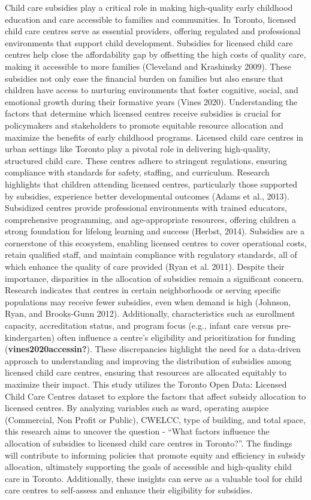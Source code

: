 \documentclass[
  letterpaper,
  DIV=11,
  numbers=noendperiod]{scrartcl}
\begin{document}
Child care subsidies play a critical role in making high-quality early
childhood education and care accessible to families and communities. In
Toronto, licensed child care centres serve as essential providers,
offering regulated and professional environments that support child
development. Subsidies for licensed child care centres help close the
affordability gap by offsetting the high costs of quality care, making
it accessible to more families (Cleveland and Krashinsky 2009). These
subsidies not only ease the financial burden on families but also ensure
that children have access to nurturing environments that foster
cognitive, social, and emotional growth during their formative years
(Vines 2020). Understanding the factors that determine which licensed
centres receive subsidies is crucial for policymakers and stakeholders
to promote equitable resource allocation and maximize the benefits of
early childhood programs. Licensed child care centres in urban settings
like Toronto play a pivotal role in delivering high-quality, structured
child care. These centres adhere to stringent regulations, ensuring
compliance with standards for safety, staffing, and curriculum. Research
highlights that children attending licensed centres, particularly those
supported by subsidies, experience better developmental outcomes (Adams
et al., 2013). Subsidized centres provide professional environments with
trained educators, comprehensive programming, and age-appropriate
resources, offering children a strong foundation for lifelong learning
and success (Herbst, 2014). Subsidies are a cornerstone of this
ecosystem, enabling licensed centres to cover operational costs, retain
qualified staff, and maintain compliance with regulatory standards, all
of which enhance the quality of care provided (Ryan et al. 2011).
Despite their importance, disparities in the allocation of subsidies
remain a significant concern. Research indicates that centres in certain
neighborhoods or serving specific populations may receive fewer
subsidies, even when demand is high (Johnson, Ryan, and Brooks‐Gunn
2012). Additionally, characteristics such as enrollment capacity,
accreditation status, and program focus (e.g., infant care versus
pre-kindergarten) often influence a centre's eligibility and
prioritization for funding (\textbf{vines2020accessin?}). These
discrepancies highlight the need for a data-driven approach to
understanding and improving the distribution of subsidies among licensed
child care centres, ensuring that resources are allocated equitably to
maximize their impact. This study utilizes the Toronto Open Data:
Licensed Child Care Centres dataset to explore the factors that affect
subsidy allocation to licensed centres. By analyzing variables such as
ward, operating auspice (Commercial, Non Profit or Public), CWELCC, type
of building, and total space, this research aims to uncover the question
- ``What factors influence the allocation of subsidies to licensed child
care centres in Toronto?''. The findings will contribute to informing
policies that promote equity and efficiency in subsidy allocation,
ultimately supporting the goals of accessible and high-quality child
care in Toronto. Additionally, these insights can serve as a valuable
tool for child care centres to self-assess and enhance their eligibility
for subsidies.
\end{document}
